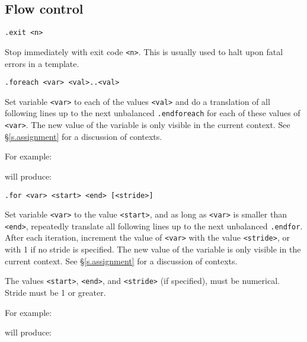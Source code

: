 \subsection{Flow control}
\begin{verbatim}
.exit <n>
\end{verbatim}
\begin{desc}
Stop {\Tm} immediately with exit code \texttt{<n>}.
This is usually used to halt upon fatal errors in a template.
\end{desc}
\begin{verbatim}
.foreach <var> <val>..<val>
\end{verbatim}
\begin{desc}
Set variable \texttt{<var>} to each of the values \texttt{<val>} and do a
translation of all following lines up to the next unbalanced
\texttt{.endforeach} for each of these values of \texttt{<var>}.
The new value of the variable is only visible in the current context.
See \S\ref{s.assignment} for a discussion of contexts.

For example:
\begin{showfile}

\end{showfile}
will produce:
\begin{showfile}

\end{showfile}
\end{desc}
\begin{verbatim}
.for <var> <start> <end> [<stride>]
\end{verbatim}
\begin{desc}
Set variable \texttt{<var>} to the value \texttt{<start>},
and as long as \texttt{<var>} is smaller than \texttt{<end>},
repeatedly translate all
following lines up to the next unbalanced
\texttt{.endfor}.
After each iteration, increment the value of
\texttt{<var>} with the value 
\texttt{<stride>}, or with 1 if no stride is specified.
The new value of the variable is only visible in the current context.
See \S\ref{s.assignment} for a discussion of contexts.

The values 
\texttt{<start>},
\texttt{<end>},
and \texttt{<stride>} (if specified), must be numerical.
Stride must be 1 or greater.

For example:
\begin{showfile}

\end{showfile}
will produce:
\begin{showfile}

\end{showfile}
\end{desc}
